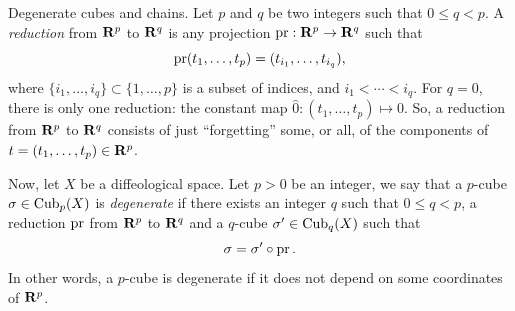 \begin{Article}{Degenerate cubes and chains.}{}
  \label{Degenerate-cubes-and-chains}
  Let $p$ and $q$ be two integers such that $0 \leq q < p$.
  A \emph{reduction} from $\mathbf{R}^p$ to $\mathbf{R}^q$ is any projection $\operatorname{pr} : \mathbf{R}^p \to \mathbf{R}^q$ such that
  $$%
    \Proj(t_1, \ldots , t_p) = (t_{i_1}, \ldots , t_{i_q}),
  $$%
  where $\{i_1,\ldots,i_q\} \subset \{1, \ldots , p\}$ is a subset of indices,
  and $i_1 < \cdots <i_q$.
  For $q = 0$,
  there is only one reduction: the constant map $\hat 0 : (t_1,\ldots,t_p) \mapsto 0$.
  So,
  a reduction from $\mathbf{R}^p$ to $\mathbf{R}^q$ consists of just ``forgetting'' some,
  or all,
  of the components of $t = (t_1, \ldots , t_p) \in \mathbf{R}^p$.

  Now,
  let $X$ be a diffeological space.
  Let $p > 0$ be an integer,
  we say that a $p$-cube $\sigma \in \operatorname{Cub}_{p}(X)$ is \emph{degenerate} if there exists an integer $q$ such that $0 \leq q < p$,
  a reduction $\operatorname{pr}$ from $\mathbf{R}^p$ to $\mathbf{R}^q$ and a $q$-cube $\sigma' \in \operatorname{Cub}_{q}(X)$ such that
  $$%
    \sigma = \sigma' \circ \Proj.
  $$%
  In other words,
  a $p$-cube is degenerate if it does not depend on some coordinates of $\mathbf{R}^p$.


\end{Article}
